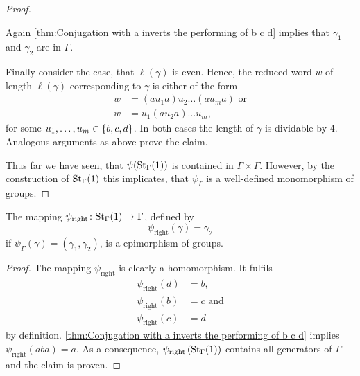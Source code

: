 \begin{proof}
\begin{clist}
\begin{equation*}
\end{equation*}
Again \cref{thm:Conjugation with a inverts the performing of b c d} implies that $\gamma_1$ and $\gamma_2$ are in $\Gamma$.
\item Finally consider the case, that $\ell(\gamma)$ is even. Hence, the reduced word $w$ of length $\ell(\gamma)$ corresponding to $\gamma$ is either of the form
\begin{align*}
w&=(au_1a)u_2\ldots (au_ma) \text{ or}\\
w&=u_1(au_2a)\ldots u_m,
\end{align*}
for some $\seq[m]{u}\in\lbrace b,c,d\rbrace$. In both cases the length of $\gamma$ is dividable by 4. Analogous arguments as above prove the claim.
\end{clist}
Thus far we have seen, that $\psi(\St[\Gamma]{1})$ is contained in $\Gamma\times\Gamma$. However, by the construction of $\St[\Gamma]{1}$ this implicates, that $\psi_\Gamma$ is a well-defined monomorphism of groups.
\end{proof}

\begin{thm}\label{thm:Gamma is infinite}
The mapping $\psi_\mathrm{right}\colon\St[\Gamma]{1}\to\Gamma$, defined by
\begin{equation*}
\psi_\mathrm{right}(\gamma)=\gamma_2
\end{equation*}
if $\psi_\Gamma(\gamma)=(\gamma_1,\gamma_2)$, is a epimorphism of groups.
\end{thm}
\begin{proof}
The mapping $\psi_\mathrm{right}$ is clearly a homomorphism. It fulfils
\begin{align*}
\psi_\mathrm{right}(d)&=b,\\
\psi_\mathrm{right}(b)&=c \text{ and}\\
\psi_\mathrm{right}(c)&=d
\end{align*}
by definition. \cref{thm:Conjugation with a inverts the performing of b c d} implies $\psi_\mathrm{right}(aba)=a$. As a consequence, $\psi_\mathrm{right}\left(\St[\Gamma]{1}\right)$ contains all generators of $\Gamma$ and the claim is proven. 
\end{proof}

